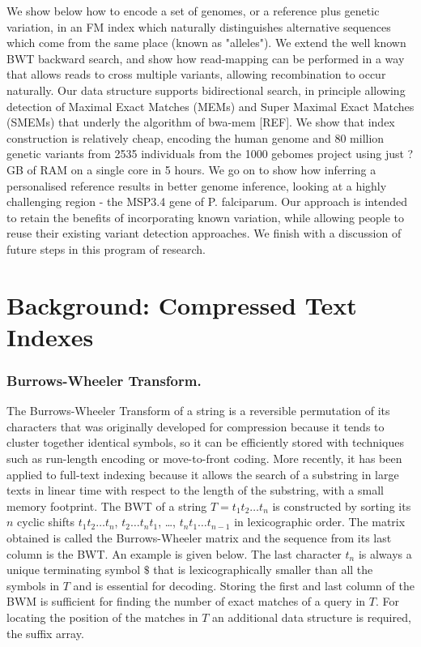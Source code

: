 \documentclass[runningheads,a4paper]{llncs}
\begin{document}
 We show below how to encode a set of genomes, or a reference plus  genetic variation, in an FM index which naturally distinguishes alternative sequences which come from the same place (known as "alleles"). We extend the well known BWT backward search, and show how read-mapping can be performed in a way that allows reads to cross multiple variants, allowing recombination to occur naturally. Our data structure  supports bidirectional search, in principle allowing detection of Maximal Exact Matches (MEMs) and Super Maximal Exact Matches (SMEMs) that underly the algorithm of bwa-mem [REF]. We show that index construction is relatively cheap, encoding the human genome and 80 million genetic variants from 2535 individuals from the 1000 gebomes project using just ? GB of RAM on a single core in 5 hours. We go on to show how inferring a personalised reference results in better genome inference, looking at a highly challenging region - the MSP3.4 gene of P. falciparum. Our approach is intended to retain the benefits of incorporating known variation, while allowing people to reuse their existing variant detection approaches. We finish with a discussion of future steps in this program of research.

\section{Background: Compressed Text Indexes}

\subsubsection{Burrows-Wheeler Transform.}
The Burrows-Wheeler Transform of a string is a reversible permutation of its characters that was originally developed for compression because it tends to cluster together identical symbols, so it can be efficiently stored with techniques such as run-length encoding or move-to-front coding. More recently, it has been applied to full-text indexing because it allows the search of a substring in large texts in linear time with respect to the length of the substring, with a small memory footprint. The BWT of a string $T=t_1t_2 \ldots t_n$ is constructed by sorting its $n$ cyclic shifts $t_1t_2 \ldots t_n$, $t_2 \ldots t_n t_1$, \ldots,  $t_n t_1 \ldots t_{n-1}$ in lexicographic order. The matrix obtained is called the Burrows-Wheeler matrix and the sequence from its last column is the BWT. An example is given below. The last character $t_n$ is always a unique terminating symbol $\$$ that is lexicographically smaller than all the symbols in $T$ and is essential for decoding. Storing the first and last column of the BWM is sufficient for finding the number of exact matches of a query in $T$. For locating the position of the matches in $T$ an additional data structure is required, the suffix array. 
\end{document}
